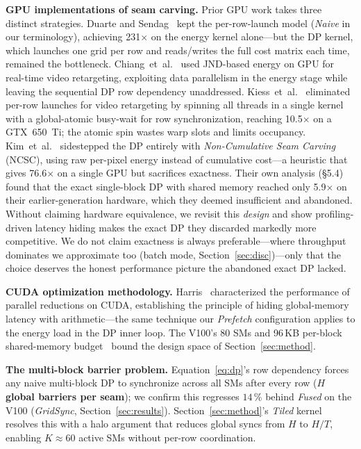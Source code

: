 \textbf{GPU implementations of seam carving.}
Prior GPU work takes three distinct strategies. Duarte and
Sendag~\cite{duarte2012} kept the per-row-launch model (\emph{Naive} in our
terminology), achieving 231$\times$ on the energy kernel alone---but the DP
kernel, which launches one grid per row and reads/writes the full cost matrix
each time, remained the bottleneck.
Chiang~et~al.~\cite{chiang2009} used JND-based energy on GPU for real-time
video retargeting, exploiting data parallelism in the energy stage while
leaving the sequential DP row dependency unaddressed.
Kiess~et~al.~\cite{kiess2014} eliminated per-row launches for video retargeting
by spinning all threads in a single kernel with a global-atomic busy-wait for row
synchronization, reaching 10.5$\times$ on a GTX~650~Ti; the atomic spin wastes
warp slots and limits occupancy.
Kim~et~al.~\cite{kim2015} sidestepped the DP entirely with \emph{Non-Cumulative
Seam Carving} (NCSC), using raw per-pixel energy instead of cumulative
cost---a heuristic that gives 76.6$\times$ on a single GPU but sacrifices
exactness. Their own analysis (\S5.4) found that the exact single-block DP with
shared memory reached only 5.9$\times$ on their earlier-generation hardware,
which they deemed insufficient and abandoned. Without claiming hardware
equivalence, we revisit this \emph{design} and show profiling-driven latency
hiding makes the exact DP they discarded markedly more competitive. We do not
claim exactness is always preferable---where throughput dominates we approximate
too (batch mode, Section~\ref{sec:disc})---only that the choice deserves the
honest performance picture the abandoned exact DP lacked.

\textbf{CUDA optimization methodology.}
Harris~\cite{harris2007} characterized the performance of parallel reductions
on CUDA, establishing the principle of hiding global-memory latency with
arithmetic---the same technique our \emph{Prefetch} configuration applies to the
energy load in the DP inner loop. The V100's 80 SMs and 96\,KB per-block
shared-memory budget~\cite{voltawp} bound the design space of
Section~\ref{sec:method}.

\textbf{The multi-block barrier problem.}
Equation~\eqref{eq:dp}'s row dependency forces any naive multi-block DP to
synchronize across all SMs after every row (\textbf{$H$ global barriers per
seam}); we confirm this regresses $14\,\%$ behind \emph{Fused} on the V100
(\emph{GridSync}, Section~\ref{sec:results}).
Section~\ref{sec:method}'s \emph{Tiled} kernel resolves this with a halo
argument that reduces global syncs from $H$ to $H/T$, enabling $K{\approx}60$
active SMs without per-row coordination.
